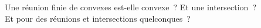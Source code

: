 Une réunion finie de convexes est-elle convexe~? Et une intersection~?\\
Et pour des réunions et intersections quelconques~?
